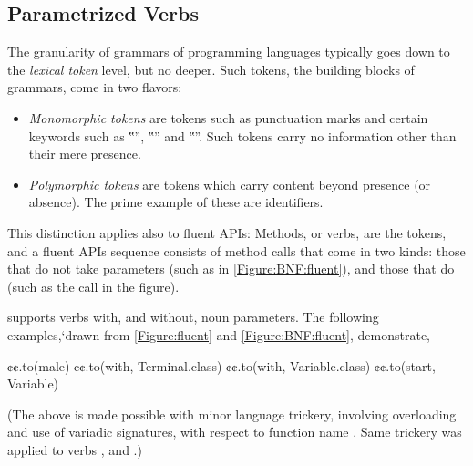 \subsection{Parametrized Verbs}
The granularity of grammars of programming languages typically goes down to the \emph{lexical token} level,
  but no deeper.
Such tokens, the building blocks of grammars, come in two flavors:
\begin{itemize}
  \item \emph{Monomorphic tokens} are tokens such as punctuation marks and
    certain keywords such as ‟”, ‟” and ‟”.
    Such tokens carry no information other than their mere presence.
  \item \emph{Polymorphic tokens} are tokens which carry content beyond
    presence (or absence). The prime example of these are identifiers.
\end{itemize}

This distinction applies also to fluent APIs:
Methods, or verbs, are the tokens, and a fluent APIs sequence consists of
method calls that come in two kinds: those that do not take parameters (such as  in \cref{Figure:BNF:fluent}),
and those that do (such as the call  in the figure).

\Self supports verbs with, and without, noun parameters.
The following examples,`drawn from \cref{Figure:fluent} and \cref{Figure:BNF:fluent},
  demonstrate,
\begin{JAVA}
  ¢¢.to(male)
  ¢¢.to(with, Terminal.class)
  ¢¢.to(with, Variable.class)
  ¢¢.to(start, Variable)\end{JAVA}
(The above is made possible with minor \Java language trickery,
  involving overloading and use of variadic signatures,
  with respect to function name .
Same trickery was applied to verbs , and .)
